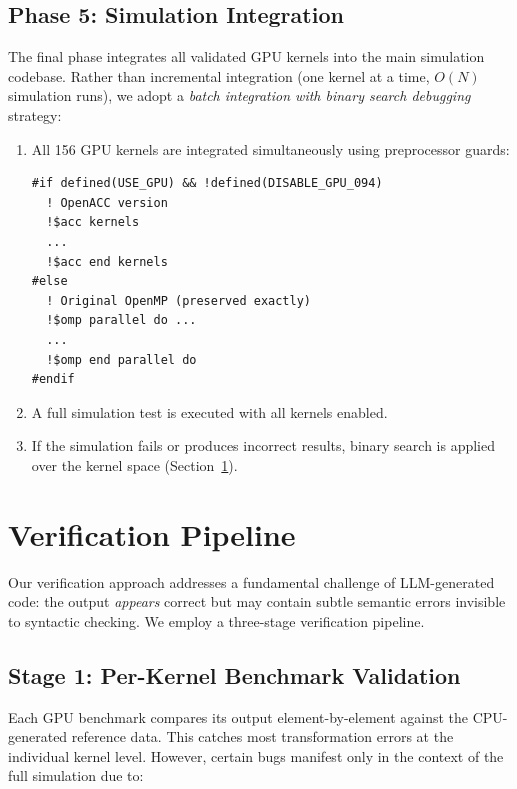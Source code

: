 \documentclass[conference]{IEEEtran}
\begin{document}
\subsection{Phase 5: Simulation Integration}

The final phase integrates all validated GPU kernels into the main simulation
codebase. Rather than incremental integration (one kernel at a time, $O(N)$
simulation runs), we adopt a \emph{batch integration with binary search
debugging} strategy:

\begin{enumerate}
\item All 156 GPU kernels are integrated simultaneously using preprocessor
  guards:

\begin{lstlisting}[style=fortran, caption={Preprocessor-based kernel control.}, label={lst:guard}]
#if defined(USE_GPU) && !defined(DISABLE_GPU_094)
  ! OpenACC version
  !$acc kernels
  ...
  !$acc end kernels
#else
  ! Original OpenMP (preserved exactly)
  !$omp parallel do ...
  ...
  !$omp end parallel do
#endif
\end{lstlisting}

\item A full simulation test is executed with all kernels enabled.

\item If the simulation fails or produces incorrect results, binary search
  is applied over the kernel space (Section~\ref{sec:verification}).
\end{enumerate}

\section{Verification Pipeline}
\label{sec:verification}

Our verification approach addresses a fundamental challenge of LLM-generated
code: the output \emph{appears} correct but may contain subtle semantic
errors invisible to syntactic checking. We employ a three-stage verification
pipeline.

\subsection{Stage 1: Per-Kernel Benchmark Validation}

Each GPU benchmark compares its output element-by-element against the
CPU-generated reference data. This catches most transformation errors at the
individual kernel level. However, certain bugs manifest only in the context
of the full simulation due to:
\end{document}
